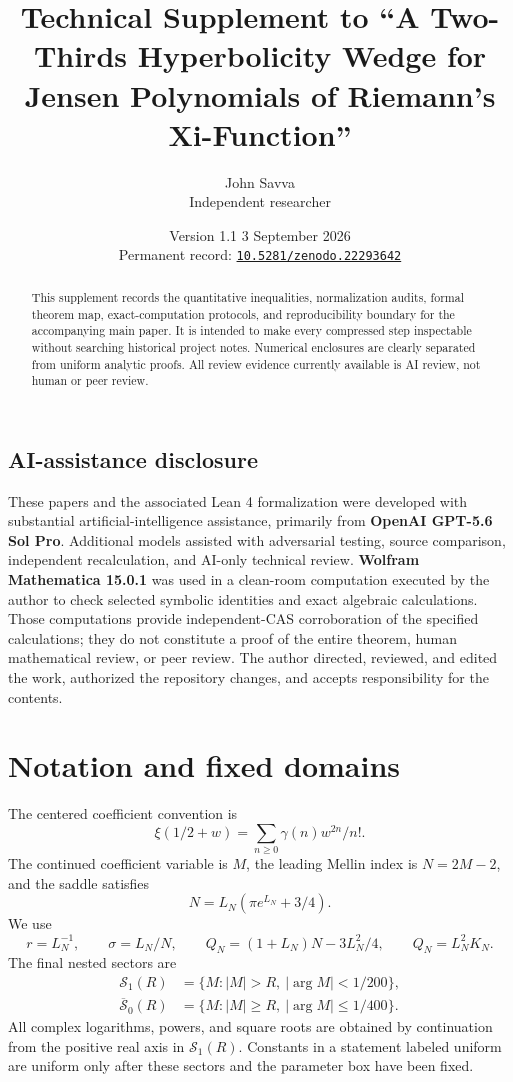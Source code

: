 \documentclass[10pt]{article}
\title{Technical Supplement to ``A Two-Thirds Hyperbolicity Wedge for Jensen Polynomials of Riemann's Xi-Function''}
\author{John Savva\\{\small Independent researcher}}
\date{Version 1.1 \textemdash{} 3 September 2026\\{\small Permanent record: \href{https://doi.org/10.5281/zenodo.22293642}{\texttt{10.5281/zenodo.22293642}}}}
\begin{document}
\maketitle

\begin{abstract}
This supplement records the quantitative inequalities, normalization audits,
formal theorem map, exact-computation protocols, and reproducibility boundary
for the accompanying main paper.  It is intended to make every compressed
step inspectable without searching historical project notes.  Numerical
enclosures are clearly separated from uniform analytic proofs.  All review
evidence currently available is AI review, not human or peer review.
\end{abstract}
\subsection*{AI-assistance disclosure}
These papers and the associated Lean 4 formalization were developed with
substantial artificial-intelligence assistance, primarily from
\textbf{OpenAI GPT-5.6 Sol Pro}.  Additional models assisted with adversarial
testing, source comparison, independent recalculation, and AI-only technical
review.  \textbf{Wolfram Mathematica 15.0.1} was used in a clean-room
computation executed by the author to check selected symbolic identities and
exact algebraic calculations.  Those computations provide independent-CAS
corroboration of the specified calculations; they do not constitute a proof
of the entire theorem, human mathematical review, or peer review.  The author
directed, reviewed, and edited the work, authorized the repository changes,
and accepts responsibility for the contents.


\tableofcontents

\section{Notation and fixed domains}\label{sup:notation}

The centered coefficient convention is
\[
 \xi(1/2+w)=\sum_{n\ge0}\gamma(n)w^{2n}/n!.
\]
The continued coefficient variable is $M$, the leading Mellin index is
$N=2M-2$, and the saddle satisfies
\[
 N=L_N(\pi e^{L_N}+3/4).
\]
We use
\[
 r=L_N^{-1},\qquad \sigma=L_N/N,\qquad
 Q_N=(1+L_N)N-3L_N^2/4,\qquad Q_N=L_N^2K_N.
\]
The final nested sectors are
\begin{align*}
 \mathcal S_1(R)&=\{M:|M|>R,\ |\arg M|<1/200\},\\
 \overline{\mathcal S}_0(R)&=\{M:|M|\ge R,\ |\arg M|\le1/400\}.
\end{align*}
All complex logarithms, powers, and square roots are obtained by continuation
from the positive real axis in $\mathcal S_1(R)$.  Constants in a statement
labeled uniform are uniform only after these sectors and the parameter box
have been fixed.
\end{document}
